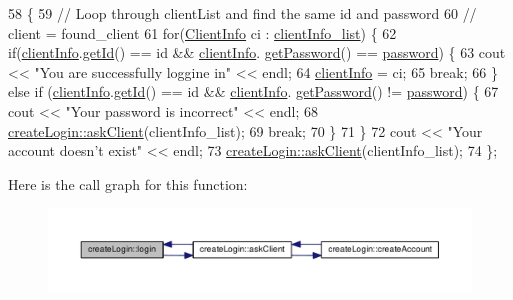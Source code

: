 \begin{DoxyCode}
58 \{
59     \textcolor{comment}{// Loop through clientList and find the same id and password}
60     \textcolor{comment}{// client = found\_client}
61     \textcolor{keywordflow}{for}(\hyperlink{class_client_info}{ClientInfo} ci :  \hyperlink{classcreate_login_a5ea072e63025feb0343c502dbf821d1e}{clientInfo\_list}) \{
62         \textcolor{keywordflow}{if}(\hyperlink{classcreate_login_a7e6af52371ef69fee03fa9f8b152c9f3}{clientInfo}.\hyperlink{class_client_info_a55ac97ddc9f3e2d2719614c07f71e3af}{getId}() == \textcolor{keywordtype}{id} && \hyperlink{classcreate_login_a7e6af52371ef69fee03fa9f8b152c9f3}{clientInfo}.
      \hyperlink{class_client_info_a513532bdc9245093e1f62abba5ca9f35}{getPassword}() == \hyperlink{classcreate_login_aee8e305c94308da429f2f2e7c6d08370}{password}) \{ 
63             cout << \textcolor{stringliteral}{"You are successfully loggine in"} << endl;
64             \hyperlink{classcreate_login_a7e6af52371ef69fee03fa9f8b152c9f3}{clientInfo} = ci;
65             \textcolor{keywordflow}{break};  
66         \} \textcolor{keywordflow}{else} \textcolor{keywordflow}{if} (\hyperlink{classcreate_login_a7e6af52371ef69fee03fa9f8b152c9f3}{clientInfo}.\hyperlink{class_client_info_a55ac97ddc9f3e2d2719614c07f71e3af}{getId}() == \textcolor{keywordtype}{id} && \hyperlink{classcreate_login_a7e6af52371ef69fee03fa9f8b152c9f3}{clientInfo}.
      \hyperlink{class_client_info_a513532bdc9245093e1f62abba5ca9f35}{getPassword}() != \hyperlink{classcreate_login_aee8e305c94308da429f2f2e7c6d08370}{password}) \{
67             cout << \textcolor{stringliteral}{"Your password is incorrect"} << endl;
68             \hyperlink{classcreate_login_a564c74834f64e0af3d77a48611e6801b}{createLogin::askClient}(clientInfo\_list);
69             \textcolor{keywordflow}{break};
70         \} 
71     \}
72     cout << \textcolor{stringliteral}{"Your account doesn't exist"} << endl;
73     \hyperlink{classcreate_login_a564c74834f64e0af3d77a48611e6801b}{createLogin::askClient}(clientInfo\_list);
74 \};
\end{DoxyCode}


Here is the call graph for this function\+:
\nopagebreak
\begin{figure}[H]
\begin{center}
\leavevmode
\includegraphics[width=350pt]{classcreate_login_a6012395d12f24689de88dafd5917bf89_cgraph}
\end{center}
\end{figure}




